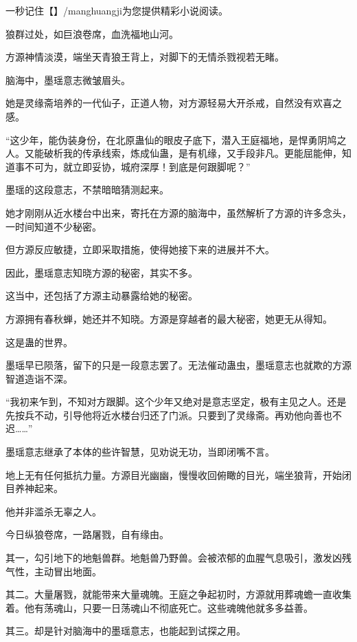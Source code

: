 
\begin{this_body}

一秒记住【】/manghuangji为您提供精彩小说阅读。

狼群过处，如巨浪卷席，血洗福地山河。

方源神情淡漠，端坐天青狼王背上，对脚下的无情杀戮视若无睹。

脑海中，墨瑶意志微皱眉头。

她是灵缘斋培养的一代仙子，正道人物，对方源轻易大开杀戒，自然没有欢喜之感。

“这少年，能伪装身份，在北原蛊仙的眼皮子底下，潜入王庭福地，是悍勇阴鸠之人。又能破析我的传承线索，炼成仙蛊，是有机缘，又手段非凡。更能屈能伸，知道事不可为，就立即妥协，城府深厚！到底是何跟脚呢？”

墨瑶的这段意志，不禁暗暗猜测起来。

她才刚刚从近水楼台中出来，寄托在方源的脑海中，虽然解析了方源的许多念头，一时间知道不少秘密。

但方源反应敏捷，立即采取措施，使得她接下来的进展并不大。

因此，墨瑶意志知晓方源的秘密，其实不多。

这当中，还包括了方源主动暴露给她的秘密。

方源拥有春秋蝉，她还并不知晓。方源是穿越者的最大秘密，她更无从得知。

这是蛊的世界。

墨瑶早已陨落，留下的只是一段意志罢了。无法催动蛊虫，墨瑶意志也就欺的方源智道造诣不深。

“我初来乍到，不知对方跟脚。这个少年又绝对是意志坚定，极有主见之人。还是先按兵不动，引导他将近水楼台归还了门派。只要到了灵缘斋。再劝他向善也不迟……”

墨瑶意志继承了本体的些许智慧，见劝说无功，当即闭嘴不言。

地上无有任何抵抗力量。方源目光幽幽，慢慢收回俯瞰的目光，端坐狼背，开始闭目养神起来。

他并非滥杀无辜之人。

今日纵狼卷席，一路屠戮，自有缘由。

其一，勾引地下的地魁兽群。地魁兽乃野兽。会被浓郁的血腥气息吸引，激发凶残气性，主动冒出地面。

其二。大量屠戮，就能带来大量魂魄。王庭之争起初时，方源就用葬魂蟾一直收集着。他有荡魂山，只要一日荡魂山不彻底死亡。这些魂魄他就多多益善。

其三。却是针对脑海中的墨瑶意志，也能起到试探之用。


\end{this_body}
